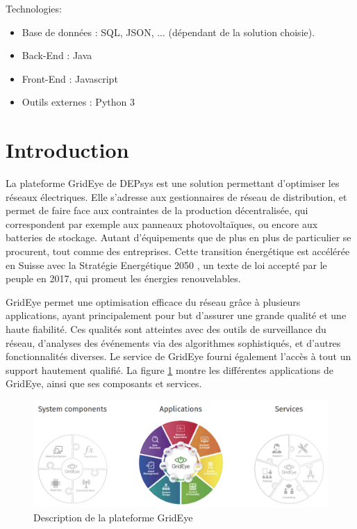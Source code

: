 \documentclass[paper=a4, fontsize=11pt]{scrartcl}
\begin{document}
Technologies:

\begin{itemize}
    \item Base de données : SQL, JSON, ... (dépendant de la solution choisie).
    \item Back-End : Java
    \item Front-End : Javascript 
    \item Outils externes : Python 3
\end{itemize}
\newpage

\renewcommand{\contentsname}{Table des matières}
\tableofcontents

\newpage

\section{Introduction}

La plateforme GridEye de DEPsys \cite{noauthor_depsys_nodate} est une solution permettant d'optimiser les réseaux électriques. Elle s'adresse aux gestionnaires de réseau de distribution, et permet de faire face aux contraintes de la production décentralisée, qui correspondent par exemple aux panneaux photovoltaïques, ou encore aux batteries de stockage. Autant d'équipements que de plus en plus de particulier se procurent, tout comme des entreprises. Cette transition énergétique est accélérée en Suisse avec la \og Stratégie Energétique 2050 \fg, un texte de loi accepté par le peuple en 2017, qui promeut les énergies renouvelables.

GridEye permet une optimisation efficace du réseau grâce à plusieurs applications, ayant principalement pour but d'assurer une grande qualité et une haute fiabilité. Ces qualités sont atteintes avec des outils de surveillance du réseau, d'analyses des événements via des algorithmes sophistiqués, et d'autres fonctionnalités diverses. Le service de GridEye fourni également l'accès à tout un support hautement qualifié. La figure \ref{f-GridEyeDescription} montre les différentes applications de GridEye, ainsi que ses composants et services.

\begin{figure}[H]
    \centering
    \includegraphics[width=18cm]{img/screenshots/GridEye.png}
    \caption{Description de la plateforme GridEye \cite{noauthor_depsys_nodate}}
    \label{f-GridEyeDescription}
\end{figure}
\end{document}
